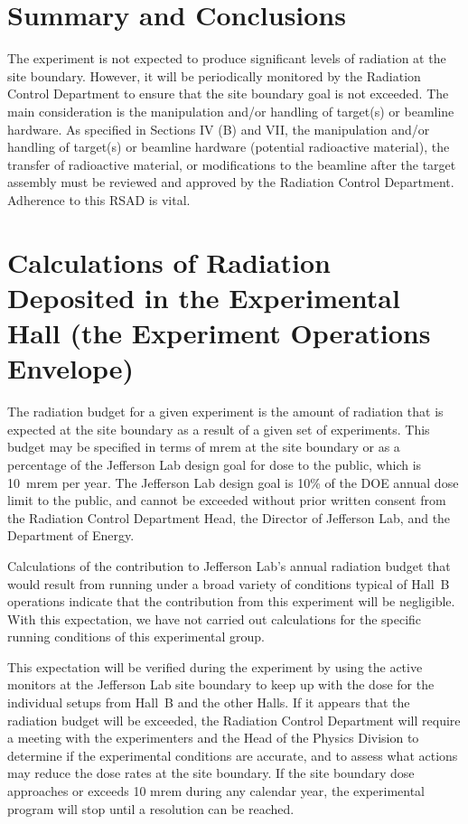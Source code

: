 \documentclass [12pt]{article}
\begin{document}

\section{Summary and Conclusions}
\indent

The experiment is not expected to produce significant levels of radiation at the site boundary. 
However, it will be periodically monitored by the Radiation Control Department to ensure that the 
site boundary goal is not exceeded. The main consideration is the manipulation and/or handling of 
target(s) or beamline hardware. As specified in Sections IV (B) and VII, the manipulation and/or 
handling of target(s) or beamline hardware (potential radioactive material), the transfer of 
radioactive material, or modifications to the beamline after the target assembly must be reviewed 
and approved by the Radiation Control Department. Adherence to this RSAD is vital.


\section{Calculations of Radiation Deposited in the Experimental Hall
(the Experiment Operations Envelope)} 
\indent

The radiation budget for a given experiment is the amount of radiation that is expected at the 
site boundary as a result of a given set of experiments. This budget may be specified in terms 
of mrem at the site boundary or as a percentage of the Jefferson Lab design goal for dose to the 
public, which is 10~mrem per year. The Jefferson Lab design goal is 10\% of the DOE annual dose 
limit to the public, and cannot be exceeded without prior written consent from the Radiation 
Control Department Head, the Director of Jefferson Lab, and the Department of Energy. 

Calculations of the contribution to Jefferson Lab's annual radiation budget that would result 
from running under a broad variety of conditions typical of Hall~B operations indicate that 
the contribution from this experiment will be negligible. With this expectation, we have not 
carried out calculations for the specific running conditions of this experimental group. 

This expectation will be verified during the experiment by using the active monitors at the 
Jefferson Lab site boundary to keep up with the dose for the individual setups from Hall~B and 
the other Halls. If it appears that the radiation budget will be exceeded, the Radiation
Control Department will require a meeting with the experimenters and the Head of the 
Physics Division to determine if the experimental conditions are accurate, and to assess what 
actions may reduce the dose rates at the site boundary. If the site boundary dose approaches or
exceeds 10 mrem during any calendar year, the experimental program will stop until a resolution 
can be reached. 
\end{document}
